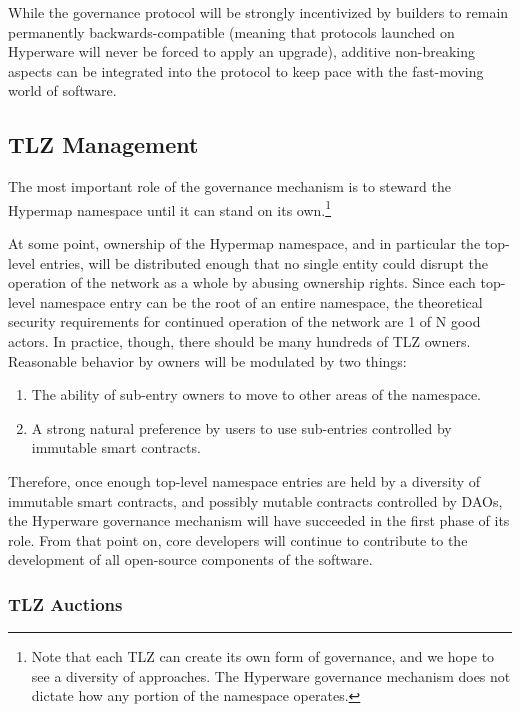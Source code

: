 \documentclass[runningheads]{llncs}
\begin{document}
While the governance protocol will be strongly incentivized by builders to remain permanently backwards-compatible (meaning that protocols launched on Hyperware will never be forced to apply an upgrade), additive non-breaking aspects can be integrated into the protocol to keep pace with the fast-moving world of software.

\subsection{TLZ Management}
\label{sec:tlzmanagement}

The most important role of the governance mechanism is to steward the Hypermap namespace until it can stand on its own.\footnote{Note that each TLZ can create its own form of governance, and we hope to see a diversity of approaches. The Hyperware governance mechanism does not dictate how any portion of the namespace operates.}

At some point, ownership of the Hypermap namespace, and in particular the top-level entries, will be distributed enough that no single entity could disrupt the operation of the network as a whole by abusing ownership rights.
Since each top-level namespace entry can be the root of an entire namespace, the theoretical security requirements for continued operation of the network are 1 of N good actors.
In practice, though, there should be many hundreds of TLZ owners.
Reasonable behavior by owners will be modulated by two things:
\begin{enumerate}
    \item The ability of sub-entry owners to move to other areas of the namespace.
    \item A strong natural preference by users to use sub-entries controlled by immutable smart contracts.
\end{enumerate}

Therefore, once enough top-level namespace entries are held by a diversity of immutable smart contracts, and possibly mutable contracts controlled by DAOs, the Hyperware governance mechanism will have succeeded in the first phase of its role.
From that point on, core developers will continue to contribute to the development of all open-source components of the software.

\subsubsection{TLZ Auctions}
\label{sec:tlzauctions}
\end{document}
